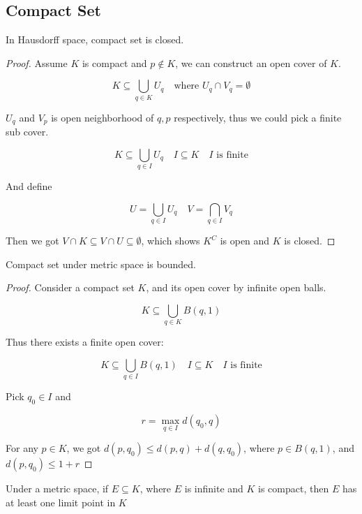 \subsection{Compact Set}
\begin{thm}
    In Hausdorff space, compact set is closed.
\end{thm}

\begin{proof}
   Assume $K$ is compact and $p \notin K$, we can construct an open cover of $K$.

   \[
        K \subseteq \bigcup_{q \in K} U_q \quad \text{where } U_q \cap V_q = \emptyset
   \]

   $U_q$ and $V_p$ is open neighborhood of $q,p$ respectively, thus we could pick a finite sub cover.

   \[
        K \subseteq \bigcup_{q \in I} U_q \quad I \subseteq K \quad I \text{ is finite}
   \]

   And define

   \[
    U = \bigcup_{q \in I} U_q \quad V = \bigcap_{q \in I} V_q
   \]

   Then we got $V \cap K \subseteq V \cap U \subseteq \emptyset$, which shows $K^C$ is open and $K$ is closed.
\end{proof}

\begin{thm}
    Compact set under metric space is bounded.
\end{thm}

\begin{proof}
    Consider a compact set $K$, and its open cover by infinite open balls.

    \[
       K \subseteq \bigcup_{q \in K} B(q, 1) 
    \]

    Thus there exists a finite open cover:

    \[
       K \subseteq \bigcup_{q \in I} B(q, 1) \quad I \subseteq K \quad I \text{ is finite}
    \]

    Pick $q_0 \in I$ and 

    \[
        r = \max_{q \in I} d(q_0, q)
    \]

    For any $p \in K$, we got $d(p, q_0) \le d(p, q) + d(q, q_0)$, where $p \in B(q, 1)$, and $d(p, q_0) \le 1 + r$
\end{proof}

\begin{thm}\label{e603cd67}
    Under a metric space, if $E \subseteq K$, where $E$ is infinite and $K$ is compact, then $E$ has at least
    one limit point in $K$
\end{thm}

